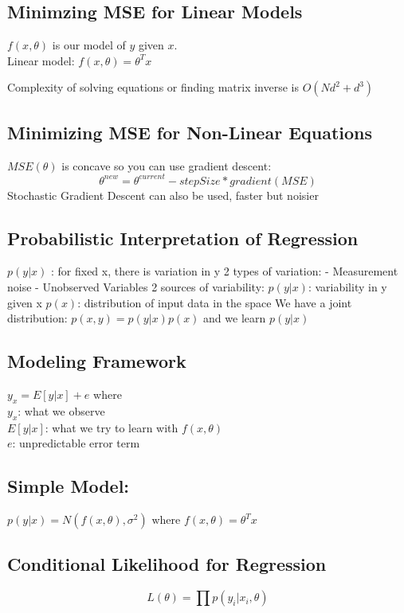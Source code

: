 \documentclass[11pt,psfig]{article}
\begin{document}
\setlength{\parskip}{1.2ex plus0.3ex minus 0.3ex}


\vfill\eject

\subsection*{Minimzing MSE for Linear Models}

$f(x,\theta)$ 	is our model of $y$ given $x$.\\

Linear model: $f(x,\theta)=\theta^T x$

Complexity of solving equations or finding matrix inverse is $O(N d^2 + d^3)$

\subsection*{Minimizing MSE for Non-Linear Equations}
$MSE(\theta)$ is concave so you can use gradient descent:
     \[
		\theta^{new} = \theta^{current} - stepSize*gradient(MSE)
		\]
Stochastic Gradient Descent can also be used, faster but noisier

\subsection*{Probabilistic Interpretation of Regression}
$p(y|x)$ : for fixed x, there is variation in y
2 types of variation:
     - Measurement noise
     - Unobserved Variables
2 sources of variability:
     $p(y|x)$: variability in y given x
     $p(x)$: distribution of input data in the space
We have a joint distribution: $p(x,y) = p(y|x)p(x)$ and we learn $p(y|x)$

\subsection*{Modeling Framework}
$y_x = E[y|x] + e$ where \\
     $y_x$: what we observe\\
     $E[y|x]$: what we try to learn with $f(x,\theta)$\\
     $e$: unpredictable error term

\subsection*{Simple Model:}
     $p(y|x) = N( f(x,\theta), \sigma^2)$ where $f(x,\theta) = \theta^Tx$

\subsection*{Conditional Likelihood for Regression}
\[
L(\theta) = \prod{p(y_i|x_i,\theta)}
\]
\end{document}
